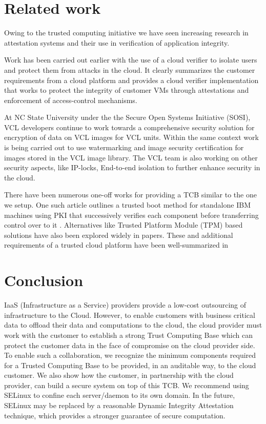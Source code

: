 \documentclass[10pt,twocolumn,pdftex]{article}
\begin{document}
\section{Related work}
Owing to the trusted computing initiative we have seen increasing research in attestation systems \cite{springerlink:10.1007/s10207-011-0124-7} and their use in verification of application integrity. 

Work has been carried out earlier with the use of a cloud verifier \cite{seeding-clouds-with-trust-anchors} to isolate users and protect them from attacks in the cloud. It clearly summarizes the customer requirements from a cloud platform and provides a cloud verifier implementation that works to protect the integrity of customer VMs through attestations and enforcement of access-control mechanisms. 

At NC State University under the the Secure Open Systems Initiative (SOSI), VCL developers continue to work \cite{5429056} towards a comprehensive security solution for encryption of data on VCL images for VCL units. Within the same context work is being carried out to use watermarking and image security certification for images stored in the VCL image library. The VCL team is also working on other security aspects, like IP-locks, End-to-end isolation to further enhance security in the cloud.

There have been numerous one-off works for providing a TCB similar to the one we setup. One such article outlines a trusted boot method for standalone IBM machines using PKI that successively verifies each component before transferring control over to it \cite{Arbaugh:1997:SRB:882493.884371}. Alternatives like Trusted Platform Module (TPM) \cite{TCG} based solutions have also been explored widely in papers\cite{towards-trusted-cloud-computing, terra, semantic-remote, Garfinkel03flexibleos}.
These and additional requirements of a trusted cloud platform have been well-summarized in \cite{seeding-clouds-with-trust-anchors} 
\label{sec:related}

\section{Conclusion}
\label{sec:conclusion}
IaaS (Infrastructure as a Service) providers provide a low-cost outsourcing of infrastructure to the Cloud. However, to enable customers with business critical data to offload their data and computations to the cloud, the cloud provider must work with the customer to establish a strong Trust Computing Base which can protect the customer data in the face of compromise on the cloud provider side. To enable such a collaboration, we recognize the minimum components required for a Trusted Computing Base to be provided, in an auditable way, to the cloud customer. We also show how the customer, in partnership with the cloud provider, can build a secure system on top of this TCB. We recommend using SELinux to confine each server/daemon to its own domain. In the future, SELinux may be replaced by a reasonable Dynamic Integrity Attestation technique, which provides a stronger guarantee of secure computation.
\end{document}
